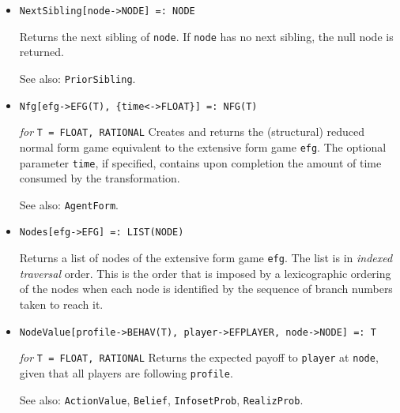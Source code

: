 \begin{itemize}
{\it for} {\tt T = FLOAT, RATIONAL} 

\bd 
Defines a new player in the extensive form game \verb+efg+.  Returns
the newly created player.  
\ed

\item{}
\protect \large \begin{verbatim}
NextSibling[node->NODE] =: NODE
\end{verbatim}\normalsize

\bd
Returns the next sibling of \verb+node+.  If \verb+node+ has no next
sibling, the null node is returned.
\item [See also:] \verb+PriorSibling+.
\ed

\item{}
\protect \large \begin{verbatim}
Nfg[efg->EFG(T), {time<->FLOAT}] =: NFG(T)
\end{verbatim}\normalsize

{\it for} {\tt T = FLOAT, RATIONAL}
\bd
Creates and returns the (structural) reduced normal form game equivalent
to the extensive form game \verb+efg+.  The optional parameter \verb+time+,
if specified, contains upon completion the amount of time consumed by
the transformation.
\item [See also:] \verb+AgentForm+.
\ed

\item{}
\protect \large \begin{verbatim}
Nodes[efg->EFG] =: LIST(NODE)
\end{verbatim}\normalsize

\bd
Returns a list of nodes of the extensive form game \verb+efg+.  The
list is in {\it indexed traversal} order.  This is the order that is
imposed by a lexicographic ordering of the nodes when each node is
identified by the sequence of branch numbers taken to reach it.  
\ed

\item{}
\protect \large \begin{verbatim}
NodeValue[profile->BEHAV(T), player->EFPLAYER, node->NODE] =: T
\end{verbatim}\normalsize

{\it for} {\tt T = FLOAT, RATIONAL}
\bd
Returns the expected payoff to \verb+player+ at \verb+node+, given
that all players are following \verb+profile+.
\item [See also:] \verb+ActionValue+, \verb+Belief+, \verb+InfosetProb+,
\verb+RealizProb+.
\ed


\end{itemize}
